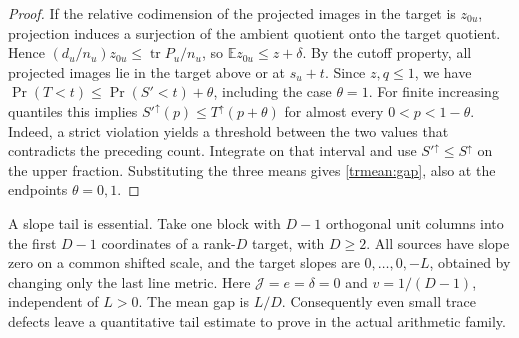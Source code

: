 \begin{proof}
If the relative codimension of the projected images in the target
is \(z_{0u}\), projection induces a surjection of the ambient
quotient onto the target quotient. Hence
\((d_u/n_u)z_{0u}\le\operatorname{tr}P_u/n_u\), so
\(\mathbb E z_{0u}\le z+\delta\). By the cutoff property, all projected
images lie in the target above or at \(s_u+t\).
Since \(z,q\le1\), we have
\(\Pr(T<t)\le\Pr(S'<t)+\theta\), including the case \(\theta=1\).
For finite increasing quantiles this implies
\(S'^\uparrow(p)\le T^\uparrow(p+\theta)\) for almost every
\(0<p<1-\theta\). Indeed, a strict violation yields a threshold
between the two values that contradicts the preceding count.
Integrate on that interval and use \(S'^\uparrow\le S^\uparrow\)
on the upper fraction. Substituting the three means gives
\eqref{trmean:gap}, also at the endpoints \(\theta=0,1\).
\end{proof}

A slope tail is essential. Take one block with \(D-1\) orthogonal unit
columns into the first \(D-1\) coordinates of a rank-\(D\) target,
with \(D\ge2\). All sources have slope zero on a common shifted scale,
and the target slopes are \(0,\ldots,0,-L\), obtained by changing
only the last line metric. Here \(\mathcal J=e=\delta=0\) and
\(v=1/(D-1)\), independent of \(L>0\). The mean gap is \(L/D\).
Consequently even small trace defects leave a quantitative tail
estimate to prove in the actual arithmetic family.

